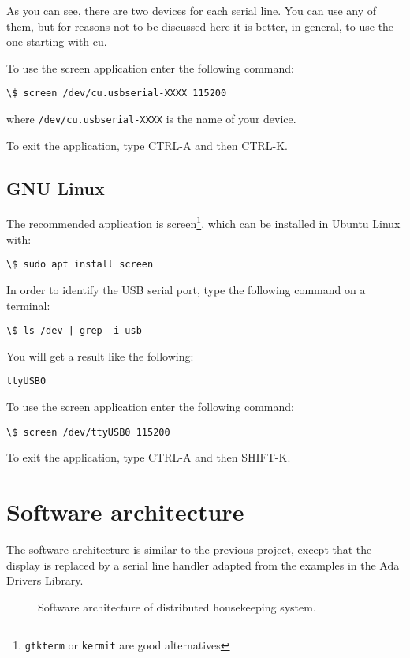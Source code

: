 As you can see, there are two devices for each serial line. You can use any of them, but for reasons not to be discussed here it is better, in general, to use the one starting with cu.

To use the screen application enter the following command:
\begin{verbatim}
\$ screen /dev/cu.usbserial-XXXX 115200
\end{verbatim}

where {\tt /dev/cu.usbserial-XXXX} is the name of your device.

To exit the application, type CTRL-A and then CTRL-K.

\subsection{GNU Linux}

The recommended application is screen\footnote{{\tt gtkterm} or {\tt kermit} are good alternatives}, which can be installed in Ubuntu Linux with:
\begin{verbatim}
\$ sudo apt install screen
\end{verbatim}

In order to identify the USB serial port, type the following command on a terminal:

\begin{verbatim}
\$ ls /dev | grep -i usb
\end{verbatim}

You will get a result like the following:
\begin{verbatim}
ttyUSB0
\end{verbatim}

To use the screen application enter the following command:

\begin{verbatim}
\$ screen /dev/ttyUSB0 115200
\end{verbatim}

To exit the application, type CTRL-A and then SHIFT-K.

\section{Software architecture}

The software architecture is similar to the previous project, except that the display is replaced by a serial line handler adapted from the examples in the Ada Drivers Library.


\begin{figure}[h]
            \caption{Software architecture of distributed housekeeping system.}
            \label{fig:distributed}
\end{figure}

